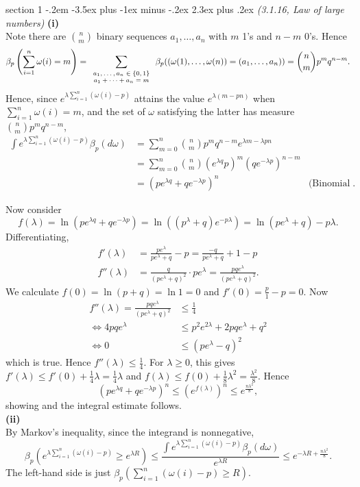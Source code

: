 \documentclass[12pt]{article}
\makeatletter
\theoremstyle{norm}
\newcommand{\rc}[1]{\frac{1}{#1}}
\newcommand{\be}[0]{\beta}
\newcommand{\la}[0]{\lambda}
\newcommand{\om}[0]{\omega}
\newcommand{\pa}[1]{\left( {#1} \right)}
\newcommand{\subprob}[1]{\noindent\textbf{#1}\\}
\newenvironment{problem}{\@startsection
       {section}
       {1}
       {-.2em}
       {-3.5ex plus -1ex minus -.2ex}
       {2.3ex plus .2ex}
       {\pagebreak[3]%
       \large\bf\noindent{Problem }
       }
       }
       {%
       }
\makeatother
\begin{document}
\begin{problem}{\it(3.1.16, Law of large numbers)}
\subprob{(i)}
Note there are $\binom nm$ binary sequences $a_1,\ldots, a_n$ with $m$ 1's and $n-m$ 0's. Hence
\[
\be_p\pa{\sum_{i=1}^n \om(i)=m}
=\sum_{\scriptsize
\begin{array}{c}
a_1,\ldots, a_n\in \{0,1\}\\
a_1+\cdots +a_n=m
\end{array}}
\be_p((\om(1),\ldots, \om(n))=(a_1,\ldots, a_n))=\binom nm p^mq^{n-m}.
\]
Hence, since $e^{\la\sum_{i=1}^n (\om(i)-p)}$ attains the value $e^{\la(m-pn)}$ when $\sum_{i=1}^n\om(i)=m$, and the set of $\om$ satisfying the latter has measure $\binom nm p^mq^{n-m}$,
\begin{align*}
\int e^{\la\sum_{i=1}^n (\om(i)-p)}\be_p(d\om)
&=\sum_{m=0}^n\binom nm p^mq^{n-m} e^{\la m-\la pn}\\
&=\sum_{m=0}^n \binom nm(e^{\la q}p)^m (qe^{-\la p})^{n-m}\\
&=(pe^{\la q}+qe^{-\la p})^n&\text{(Binomial theorem)}.
\end{align*}

Now
consider
\[f(\la)=\ln(pe^{\la q}+qe^{-\la p})=\ln((p^{\la}+q)e^{-p\la})=\ln(pe^{\la}+q)-p\la.\]
Differentiating,
\begin{align*}
f'(\la)&=\frac{pe^{\la}}{pe^{\la}+q}-p=\frac{-q}{pe^{\la}+q}+1-p\\
f''(\la)&=\frac{q}{(pe^{\la}+q)^2}\cdot pe^{\la}=\frac{pqe^{\la}}{(pe^{\la}+q)^2}.
\end{align*}
We calculate $f(0)=\ln(p+q)=\ln 1=0$ and $f'(0)=\frac{p}{1}-p=0$.
Now
\begin{align*}
f''(\la)=\frac{pqe^{\la}}{(pe^{\la}+q)^2}
&\le \rc 4\\
\iff
4pqe^{\la}&\le p^2e^{2\la}+2pqe^{\la}+q^2\\
\iff 0&\le (pe^{\la}-q)^2
\end{align*}
which is true. Hence $f''(\la)\le \rc 4$. For $\la\ge 0$, this gives $f'(\la)\le f'(0)+\rc 4\la=\rc 4 \la$ and $f(\la)\le f(0)+\rc 8 \la^2=\frac{\la^2}{8}$. Hence
\[(pe^{\la q}+qe^{-\la p})^n \le (e^{f(\la)})^n\le e^{\frac{n\la^2}{8}},\]
showing and the integral estimate follows.\\

\subprob{(ii)}
By Markov's inequality, since the integrand is nonnegative,
\[
\be_p\pa{e^{\la
\sum_{i=1}^n (\om(i)-p)}\ge e^{\la R}}
\le \frac{\int e^{\la\sum_{i=1}^n (\om(i)-p)}\be_p(d\om)}{e^{\la R}}
\le e^{-\la R+\frac{n\la^2}{8}}.
\]
The left-hand side is just $\be_p\pa{\sum_{i=1}^n (\om(i)-p)\ge R}$.


\end{problem}
\end{document}
